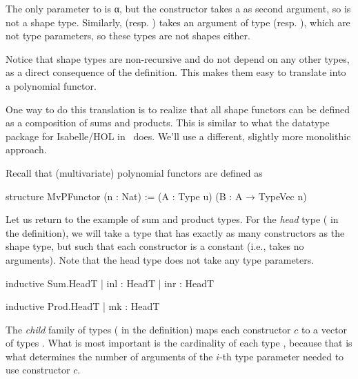The only parameter to  is α, but the  constructor takes a  as second argument,
so  is not a shape type.
Similarly,  (resp. ) takes an argument of type  (resp. ),
which are not type parameters, so these types are not shapes either.

Notice that shape types are non-recursive and do not depend on any other types, as a direct consequence 
of the definition. This makes them easy to translate into a polynomial functor. 

\begin{remark}
    One way to do this translation is to realize that all shape functors can be defined as a
    composition of sums and products. 
    This is similar to what the datatype package for Isabelle/HOL in~\cite{traytelCategoryTheoryBased} does.
    We'll use a different, slightly more monolithic approach.
\end{remark}

Recall that (multivariate) polynomial functors are defined as
\begin{leancode}
    structure MvPFunctor (n : Nat) :=
      (A : Type u) (B : A → TypeVec n)
\end{leancode}


Let us return to the example of sum and product types. 
For the \emph{head} type ( in the definition), we will take a type that has exactly as many constructors as
the shape type, but such that each constructor is a constant (i.e., takes no arguments).
Note that the head type does not take any type parameters. 

\begin{center}
    \begin{minipage}[t]{0.45\linewidth}
        \begin{leancode}
    inductive Sum.HeadT
      | inl : HeadT
      | inr : HeadT
        \end{leancode}
    \end{minipage}
    \begin{minipage}[t]{0.45\linewidth}
        \begin{leancode}    
    inductive Prod.HeadT
      | mk : HeadT
        \end{leancode}
    \end{minipage}
\end{center}

The \emph{child} family of types ( in the definition) maps each constructor $c$ to a vector of types .
What is most important is the cardinality of each type , 
because that is what determines the number of arguments of the $i$-th type parameter needed
to use constructor $c$. 

